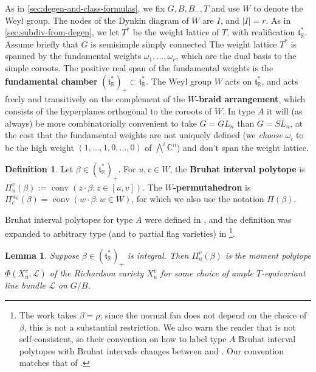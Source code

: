 \documentclass[11pt]{amsart}
\newtheorem{lemma}[Thm]{Lemma}
\theoremstyle{definition}
\newtheorem{definition}[Thm]{Definition}
\newcommand{\RR}{\mathbb{R}}
\newcommand{\CC}{\mathbb{C}}
\newcommand\defn[1]{{\bf #1}}
\def\pt{\beta}
\def\BB{{(\lie{t}_\RR^*)_+}}
\newcommand\lie[1]{{\mathfrak #1}}
\newcommand\calL{{\mathcal L}}
\DeclareMathOperator{\conv}{conv}
\begin{document}
\renewcommand\BB{{(\lie t_\RR^*)_+}}

As in \cref{sec:degen-and-class-formulas}, we fix $G, B, B_-, T$ and
use $W$ to denote the Weyl group. The nodes of the Dynkin diagram of
$W$ are $I$, and $|I|=r$. As in \cref{sec:subdiv-from-degen},
we let $T^*$ be the weight lattice of $T$, with realification $\lie t_\RR^*$.
Assume briefly that $G$ is semisimple simply connected
The weight lattice $T^*$ is spanned by the fundamental weights
$\omega_1, \dots, \omega_r$, which are the dual basis to the simple
coroots. The positive real span of the fundamental weights is the
\defn{fundamental chamber} $\BB \subset \lie t_\RR^*$. The Weyl group
$W$ acts on $\lie t_\RR^*$, and acts freely and transitively on the
complement of the \defn{$W$-braid arrangement}, which consists of the
hyperplanes orthogonal to the coroots of $W$. In type $A$ it will (as always) be more combinatorially convenient to
take $G = GL_n$ than $G = SL_n$, at the cost that the fundamental weights are
not uniquely defined (we {\em choose} $\omega_i$ to be the high weight
$(1,\ldots,1,0,\ldots,0)$ of $\bigwedge^i \CC^n$) and don't span the weight lattice.

\begin{definition}\label{def:BIP-general-type}
	Let $\pt \in \BB$. For $u, v \in W$, the \defn{Bruhat interval polytope} is $\Pi_u^v(\pt):= \conv(z \cdot \pt: z \in [u,v])$. The \defn{$W$-permutahedron} is $\Pi_e^{w_0}(\pt)= \conv(w \cdot \pt: w \in W)$, for which we also use the notation $\Pi(\pt)$. 
\end{definition}

Bruhat interval polytopes for type $A$ were defined in \cite{KW15}, and the definition was expanded to arbitrary type (and to partial flag varieties) in \cite{TW15}\footnote{The work \cite{TW15} takes $\pt=\rho$; since the normal fan does not depend on the choice of $\pt$, this is not a substantial restriction. We also warn the reader that \cite{TW15} is not self-consistent, so their convention on how to label type $A$ Bruhat interval polytopes with Bruhat intervals changes between \cite[Definition 2.2]{TW15} and \cite[Definition 7.8]{TW15}. Our convention matches that of \cite[Definition 7.8]{TW15}.}.

\begin{lemma}\label{lem:BIP-moment-polytope}
	Suppose $\pt \in \BB$ is integral. Then  $\Pi_u^v(\pt)$ is the moment polytope $\Phi(X_u^v, \calL)$ of the Richardson variety $X_u^v$ for some choice of ample $T$-equivariant line bundle $\calL$ on $G/B$. 
\end{lemma}
\end{document}
